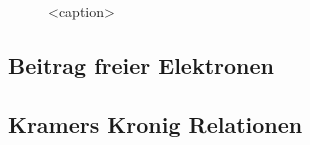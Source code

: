 \begin{figure}[htb]
    \centering
    \tfigDielectricConstantRealPart
    \tfigDielectricConstantImaginaryPart
    \caption{<caption>}
    \label{fig:dielectric_constant_real_and_imaginary_one_resonance}
\end{figure}







\subsection{Beitrag freier Elektronen\label{sec:freie_elektronen}}
\subsection{Kramers Kronig Relationen\label{sec:kramers_kronig_relation}}
